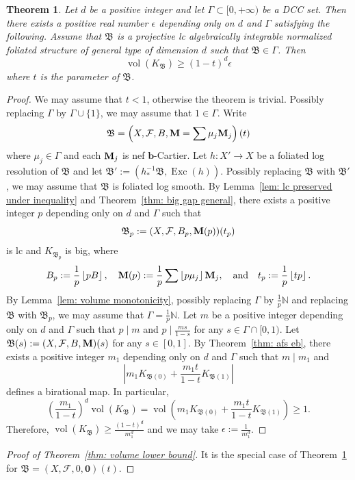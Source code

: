 \documentclass[11pt,reqno]{amsart}
\numberwithin{equation}{section}
\newcommand{\bb}{\bm{b}}
\newcommand{\Mm}{{\bf{M}}}
\newcommand{\vol}{\operatorname{vol}}
\newcommand{\Exc}{\operatorname{Exc}}
\newcommand{\Bb}{{\mathfrak{B}}}
\newcommand{\Ff}{\mathcal{F}}
\newcommand{\Ii}{\Gamma}
\newtheorem{thm}{Theorem}[section]
\theoremstyle{definition}
\begin{document}
\begin{thm}\label{thm: low bound volume}
  Let $d$ be a positive integer and let $\Ii\subset [0,+\infty)$ be a DCC set. Then there exists a positive real number $\epsilon$ depending only on $d$ and $\Ii$ satisfying the following. Assume that $\Bb$ is a projective lc algebraically integrable normalized foliated structure of general type of dimension $d$ such that $\Bb\in\Ii$. Then 
  $$\vol(K_{\Bb})\geq (1-t)^d\epsilon$$
  where $t$ is the parameter of $\Bb$.
\end{thm}
\begin{proof}
We may assume that $t<1$, otherwise the theorem is trivial. Possibly replacing $\Ii$ by $\Ii\cup\{1\}$, we may assume that $1\in\Ii$. Write 
$$\Bb=\left(X,\Ff,B,\Mm=\sum\mu_j\Mm_j\right)(t)$$
where $\mu_j\in\Ii$ and each $\Mm_j$ is nef $\bb$-Cartier. Let $h\colon X'\rightarrow X$ be a foliated log resolution of $\Bb$ and let $\Bb':=(h^{-1}_*\Bb,\Exc(h))$. Possibly replacing $\Bb$ with $\Bb'$, we may assume that $\Bb$ is foliated log smooth. By Lemma~\ref{lem: lc preserved under inequality} and Theorem~\ref{thm: big gap general}, there exists a positive integer $p$ depending only on $d$ and $\Ii$ such that 
$$\Bb_p:=(X,\Ff,B_p,\Mm(p))(t_p)$$
is lc and $K_{\Bb_p}$ is big, where
$$B_p:=\frac{1}{p}\left\lfloor pB\right\rfloor,\quad  \Mm(p):=\frac{1}{p}\sum\left\lfloor p\mu_j\right\rfloor\Mm_j,\quad \text{and}\quad t_p:=\frac{1}{p}\left\lfloor tp\right\rfloor.$$
By Lemma~\ref{lem: volume monotonicity}, possibly replacing $\Ii$ by $\frac{1}{p}\mathbb N$ and replacing $\Bb$ with $\Bb_p$, we may assume that $\Ii=\frac{1}{p}\mathbb N$. Let $m$ be a positive integer depending only on $d$ and $\Ii$ such that $p\mid m$ and $p\mid \frac{ms}{1-s}$ for any $s\in\Ii\cap [0,1)$. Let $\Bb(s):=(X,\Ff,B,\Mm)(s)$ for any $s\in [0,1]$. By Theorem~\ref{thm: afs eb}, there exists a positive integer $m_1$ depending only on $d$ and $\Ii$ such that $m\mid m_1$ and
$$\left|m_1K_{\Bb(0)}+\frac{m_1t}{1-t}K_{\Bb(1)}\right|$$
defines a birational map. In particular, 
$$\left(\frac{m_1}{1-t}\right)^d\vol(K_{\Bb})=\vol\left(m_1K_{\Bb(0)}+\frac{m_1t}{1-t}K_{\Bb(1)}\right)\geq 1.$$
Therefore, $\vol(K_{\Bb})\geq\frac{(1-t)^d}{m_1^d}$ and we may take $\epsilon:=\frac{1}{m_1^d}$.
\end{proof}

\begin{proof}[Proof of Theorem~\ref{thm: volume lower bound}]
 It is the special case of Theorem~\ref{thm: low bound volume} for $\Bb=(X,\Ff,0,\bm{0})(t)$.
\end{proof}
\end{document}
